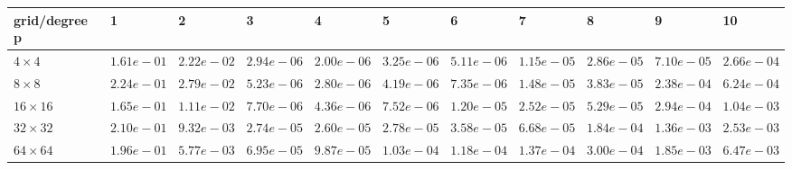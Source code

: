 \begin{tabular}{lllllllllll}
\hline
 grid/degree p   & 1          & 2          & 3          & 4          & 5          & 6          & 7          & 8          & 9          & 10         \\
\hline
 $4 \times 4$    & $1.61e-01$ & $2.22e-02$ & $2.94e-06$ & $2.00e-06$ & $3.25e-06$ & $5.11e-06$ & $1.15e-05$ & $2.86e-05$ & $7.10e-05$ & $2.66e-04$ \\
 $8 \times 8$    & $2.24e-01$ & $2.79e-02$ & $5.23e-06$ & $2.80e-06$ & $4.19e-06$ & $7.35e-06$ & $1.48e-05$ & $3.83e-05$ & $2.38e-04$ & $6.24e-04$ \\
 $16 \times 16$  & $1.65e-01$ & $1.11e-02$ & $7.70e-06$ & $4.36e-06$ & $7.52e-06$ & $1.20e-05$ & $2.52e-05$ & $5.29e-05$ & $2.94e-04$ & $1.04e-03$ \\
 $32 \times 32$  & $2.10e-01$ & $9.32e-03$ & $2.74e-05$ & $2.60e-05$ & $2.78e-05$ & $3.58e-05$ & $6.68e-05$ & $1.84e-04$ & $1.36e-03$ & $2.53e-03$ \\
 $64 \times 64$  & $1.96e-01$ & $5.77e-03$ & $6.95e-05$ & $9.87e-05$ & $1.03e-04$ & $1.18e-04$ & $1.37e-04$ & $3.00e-04$ & $1.85e-03$ & $6.47e-03$ \\
\hline
\end{tabular}
